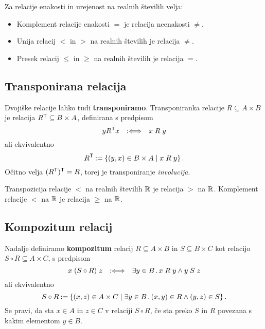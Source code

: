 \begin{zgled}
  Za relacije enakosti in urejenost na realnih številih velja:
  \begin{itemize}
  \item Komplement relacije enakosti $=$ je relacija neenakosti $\neq$.
  \item Unija relacij $<$ in $>$ na realnih številih je relacija $\neq$.
  \item Presek relacij $\leq$ in $\geq$ na realnih številih je relacija $=$.
  \end{itemize}
\end{zgled}


\subsection{Transponirana relacija}

Dvojiške relacije lahko tudi \textbf{transponiramo}. Transponiranka relacije $R \subseteq A \times B$ je relacija $R^{\mathsf{T}} \subseteq B \times A$, definirana s predpisom
%
\begin{equation*}
    y R^{\mathsf{T}} x \quad {{:}{\Longleftrightarrow}}\quad x \mathrel{R} y
\end{equation*}
%
ali ekvivalentno
%
\begin{equation*}
  R^{\mathsf{T}} \mathbin{{:}{=}} \left\{ (y, x) \in B \times A \; \middle| \; x \mathrel{R} y \right\}.
\end{equation*}
%
Očitno velja $(R^{\mathsf{T}})^{\mathsf{T}} = R$, torej je transponiranje \emph{involucija}.

\begin{zgled}
  Transpozicija relacije $<$ na realnih številih $\mathbb{R}$ je relacija $>$ na $\mathbb{R}$.
  Komplement relacije $<$ na $\mathbb{R}$ je relacija $\geq$ na $\mathbb{R}$.
\end{zgled}

\subsection{Kompozitum relacij}

Nadalje definiramo \textbf{kompozitum} relacij $R \subseteq A \times B$ in $S \subseteq B \times C$ kot relacijo $S \circ R \subseteq A \times C$, s predpisom
%
\begin{equation*}
    x \mathrel{(S \circ R)} z \quad {{:}{\Longleftrightarrow}}\quad \exists y \in B \,.\, x \mathrel{R} y \land y \mathrel{S} z
\end{equation*}
ali ekvivalentno
%
\begin{equation*}
  S \circ R \mathbin{{:}{=}}
  \left\{ (x, z) \in A \times C \; \middle| \; \exists y \in B \,.\, (x,y) \in R \land (y,z) \in S \right\}.
\end{equation*}
%
Se pravi, da sta $x \in A$ in $z \in C$ v relaciji $S \circ R$, če sta preko $S$ in $R$
povezana s kakim elementom $y \in B$.


